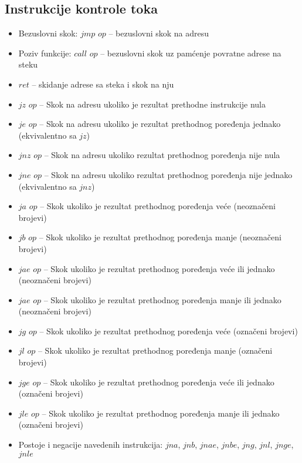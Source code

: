 \documentclass[a4paper, 10pt]{article}
\begin{document}
	\subsection{Instrukcije kontrole toka}
	\begin{itemize}
		\item Bezuslovni skok: $jmp$ $op$ -- bezuslovni skok na adresu
		\item Poziv funkcije: $call$ $op$ -- bezuslovni skok uz pamćenje povratne adrese na steku
		\item $ret$ -- skidanje adrese sa steka i skok na nju
		\item $jz$ $op$ -- Skok na adresu ukoliko je rezultat prethodne instrukcije nula
		\item $je$ $op$ -- Skok na adresu ukoliko je rezultat prethodnog poređenja jednako (ekvivalentno sa $jz$)
		\item $jnz$ $op$ -- Skok na adresu ukoliko rezultat prethodnog poređenja nije nula
		\item $jne$ $op$ -- Skok na adresu ukoliko rezultat prethodnog poređenja nije jednako (ekvivalentno sa $jnz$)
		\item $ja$ $op$ -- Skok ukoliko je rezultat prethodnog poređenja veće (neoznačeni brojevi)
		\item $jb$ $op$ -- Skok ukoliko je rezultat prethodnog poređenja manje (neoznačeni brojevi)
		\item $jae$ $op$ -- Skok ukoliko je rezultat prethodnog poređenja veće ili jednako (neoznačeni brojevi)
		\item $jae$ $op$ -- Skok ukoliko je rezultat prethodnog poređenja manje ili jednako (neoznačeni brojevi)
		\item $jg$ $op$ -- Skok ukoliko je rezultat prethodnog poređenja veće (označeni brojevi)
		\item $jl$ $op$ -- Skok ukoliko je rezultat prethodnog poređenja manje (označeni brojevi)
		\item $jge$ $op$ -- Skok ukoliko je rezultat prethodnog poređenja veće ili jednako (označeni brojevi)
		\item $jle$ $op$ -- Skok ukoliko je rezultat prethodnog poređenja manje ili jednako (označeni brojevi)
		\item Postoje i negacije navedenih instrukcija: $jna$, $jnb$, $jnae$, $jnbe$, $jng$, $jnl$, $jnge$, $jnle$
	\end{itemize}
\end{document}
